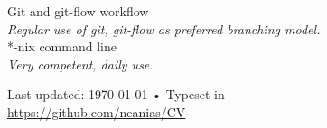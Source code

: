 \documentclass[10pt, a4paper]{article}
\begin{document}
Git and git-flow workflow\\
\emph{Regular use of git, git-flow as preferred branching model.}\\
\**-nix command line\\
\emph{Very competent, daily use.}


\vfill{}

\begin{center}
{\scriptsize  Last updated: \today\- •\-
Typeset in \href{http://nitens.org/taraborelli/cvtex}{
\XeTeX }\\
\href{https://github.com/neanias/CV}{https://github.com/neanias/CV}}
\end{center}
\end{document}

